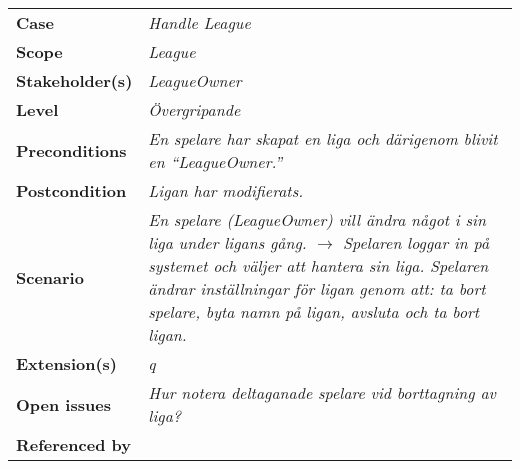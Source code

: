 \documentclass{article}
\begin{document}
    \begin{tabular}{l p{10cm}}
        \textbf{Case}           & \textit{Handle League}          \\
        \textbf{Scope}          & \textit{League}                 \\
        \textbf{Stakeholder(s)} & \textit{LeagueOwner}            \\
        \textbf{Level}          & \textit{Övergripande}           \\
        \textbf{Preconditions}  & \textit{En spelare har skapat en liga och
                                          därigenom blivit en
                                          ``LeagueOwner.''}       \\
        \textbf{Postcondition}  & \textit{Ligan har modifierats.} \\
        \textbf{Scenario}       & \textit{En spelare (LeagueOwner) vill ändra
                                          något i sin liga under ligans gång.
                                          $\rightarrow$ Spelaren loggar in på
                                          systemet och väljer att hantera sin
                                          liga. Spelaren ändrar inställningar
                                          för ligan genom att: ta bort spelare,
                                          byta namn på ligan, avsluta och ta
                                          bort ligan. }           \\
        \textbf{Extension(s)}   & \textit{q}                      \\
        \textbf{Open issues}    & \textit{Hur notera deltaganade spelare vid
                                          borttagning av liga?}   \\
        \textbf{Referenced by}  & \textit{}
    \end{tabular}
\end{document}
